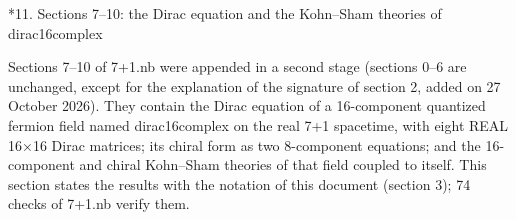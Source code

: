 \documentclass[10pt,a4paper]{article}
\makeatletter
\renewcommand\section{\@startsection{section}{1}{\z@}{-3.5ex \@plus -1ex \@minus -.2ex}{2.3ex \@plus.2ex}{\normalfont\Large\bfseries\raggedright}}
\makeatother
\begin{document}
\section*{11. Sections 7–10: the Dirac equation and the Kohn–Sham theories of dirac16complex}
Sections 7–10 of 7+1.nb were appended in a second stage (sections 0–6 are unchanged, except for the explanation of the signature of section 2, added on 27 October 2026). They contain the Dirac equation of a 16-component quantized fermion field named dirac16complex on the real 7+1 spacetime, with eight REAL 16×16 Dirac matrices; its chiral form as two 8-component equations; and the 16-component and chiral Kohn–Sham theories of that field coupled to itself. This section states the results with the notation of this document (section 3); 74 checks of 7+1.nb verify them.
\end{document}
